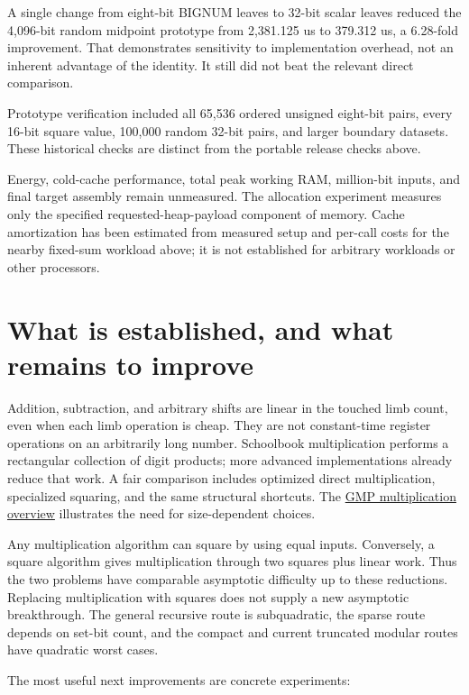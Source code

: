 \documentclass[11pt,a4paper]{article}
\begin{document}
A single change from eight-bit BIGNUM leaves to 32-bit scalar leaves reduced the 4,096-bit random midpoint prototype from 2,381.125 us to 379.312 us, a 6.28-fold improvement. That demonstrates sensitivity to implementation overhead, not an inherent advantage of the identity. It still did not beat the relevant direct comparison.

Prototype verification included all 65,536 ordered unsigned eight-bit pairs, every 16-bit square value, 100,000 random 32-bit pairs, and larger boundary datasets. These historical checks are distinct from the portable release checks above.

Energy, cold-cache performance, total peak working RAM, million-bit inputs, and final target assembly remain unmeasured. The allocation experiment measures only the specified requested-heap-payload component of memory. Cache amortization has been estimated from measured setup and per-call costs for the nearby fixed-sum workload above; it is not established for arbitrary workloads or other processors.

\section{What is established, and what remains to improve}

Addition, subtraction, and arbitrary shifts are linear in the touched limb count, even when each limb operation is cheap. They are not constant-time register operations on an arbitrarily long number. Schoolbook multiplication performs a rectangular collection of digit products; more advanced implementations already reduce that work. A fair comparison includes optimized direct multiplication, specialized squaring, and the same structural shortcuts. The \href{\detokenize{https://gmplib.org/manual/Multiplication-Algorithms}}{GMP multiplication overview} illustrates the need for size-dependent choices.

Any multiplication algorithm can square by using equal inputs. Conversely, a square algorithm gives multiplication through two squares plus linear work. Thus the two problems have comparable asymptotic difficulty up to these reductions. Replacing multiplication with squares does not supply a new asymptotic breakthrough. The general recursive route is subquadratic, the sparse route depends on set-bit count, and the compact and current truncated modular routes have quadratic worst cases.

The most useful next improvements are concrete experiments:
\end{document}
